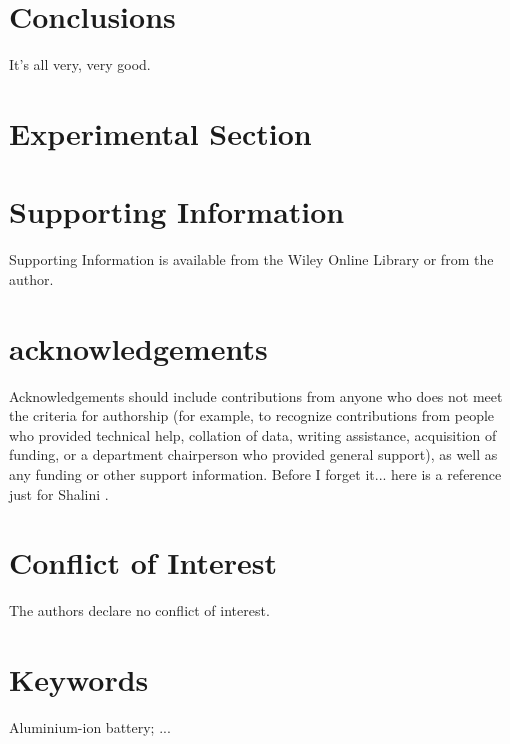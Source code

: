 \documentclass[num-refs]{wiley-article}
\begin{document}
\section{Conclusions}

It's all very, very good.

\section{Experimental Section}


\section*{Supporting Information}
Supporting  Information  is  available  from  the  Wiley  Online  Library  or  from the author.

\section*{acknowledgements}
\cite{wang_binder-free_2015}
Acknowledgements should include contributions from anyone who does not meet the criteria for authorship (for example, to recognize contributions from people who provided technical help, collation of data, writing assistance, acquisition of funding, or a department chairperson who provided general support), as well as any funding or other support information. Before I forget it... here is a reference just for Shalini \cite{lahan_al3+_2019, nacimiento_exploring_2018, li_rechargeable_2018, wei_molybdenum_2017, geng_reversible_2015}.

\section*{Conflict of Interest}
The authors declare no conflict of interest.

\section*{Keywords}
Aluminium-ion battery; ...



\pagebreak

\end{document}
